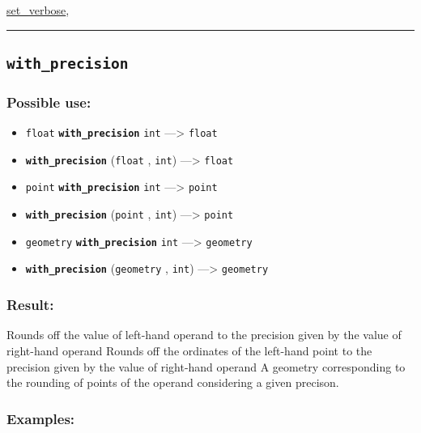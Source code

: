 \documentclass[]{book}
\providecommand{\tightlist}{%
  \setlength{\itemsep}{0pt}\setlength{\parskip}{0pt}}
\theoremstyle{definition}
\theoremstyle{definition}
\theoremstyle{definition}
\theoremstyle{remark}
\begin{document}
\href{OperatorsSZ\#set_verbose}{set\_verbose},

\begin{center}\rule{0.5\linewidth}{\linethickness}\end{center}

\subsection{\texorpdfstring{\texttt{with\_precision}}{with\_precision}}\label{with_precision}

\subsubsection{Possible use:}\label{possible-use-560}

\begin{itemize}
\tightlist
\item
  \texttt{float} \textbf{\texttt{with\_precision}} \texttt{int}
  ---\textgreater{} \texttt{float}
\item
  \textbf{\texttt{with\_precision}} (\texttt{float} , \texttt{int})
  ---\textgreater{} \texttt{float}
\item
  \texttt{point} \textbf{\texttt{with\_precision}} \texttt{int}
  ---\textgreater{} \texttt{point}
\item
  \textbf{\texttt{with\_precision}} (\texttt{point} , \texttt{int})
  ---\textgreater{} \texttt{point}
\item
  \texttt{geometry} \textbf{\texttt{with\_precision}} \texttt{int}
  ---\textgreater{} \texttt{geometry}
\item
  \textbf{\texttt{with\_precision}} (\texttt{geometry} , \texttt{int})
  ---\textgreater{} \texttt{geometry}
\end{itemize}

\subsubsection{Result:}\label{result-539}

Rounds off the value of left-hand operand to the precision given by the
value of right-hand operand Rounds off the ordinates of the left-hand
point to the precision given by the value of right-hand operand A
geometry corresponding to the rounding of points of the operand
considering a given precison.

\subsubsection{Examples:}\label{examples-387}
\end{document}
